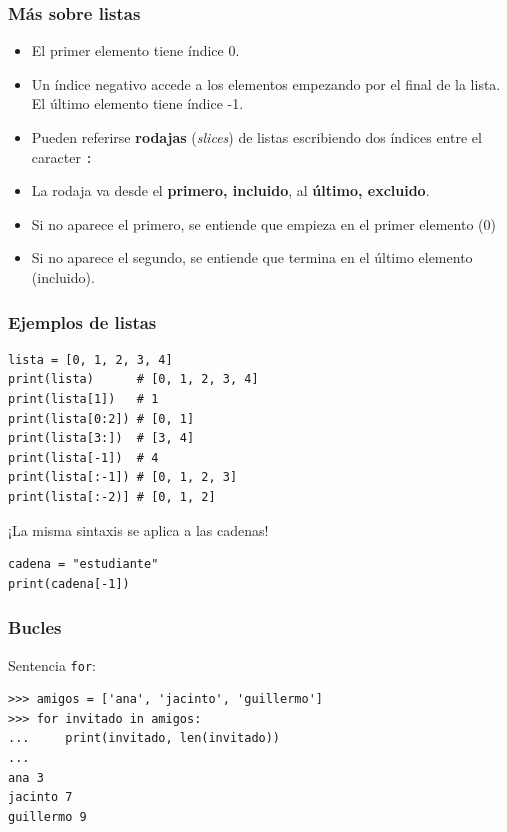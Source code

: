 \documentclass{beamer}
\begin{document}
\begin{frame}[fragile]
\frametitle{Más sobre listas}

\begin{itemize}
\item El primer elemento tiene índice 0.
\item Un índice negativo accede a los elementos empezando por el final
  de la lista. El último elemento tiene índice -1.
\item Pueden referirse {\bf rodajas} (\emph{slices}) de listas
  escribiendo dos índices entre el caracter \verb|:|
\item La rodaja va desde el {\bf primero, incluido}, al {\bf último,
    excluido}.
\item Si no aparece el primero, se entiende que empieza en el primer
  elemento (0)
\item Si no aparece el segundo, se entiende que termina en el último
  elemento (incluido). 
\end{itemize}
\end{frame}


\begin{frame}[fragile]
\frametitle{Ejemplos de listas}

  \begin{footnotesize}
\begin{verbatim}
lista = [0, 1, 2, 3, 4]
print(lista)      # [0, 1, 2, 3, 4]
print(lista[1])   # 1 
print(lista[0:2]) # [0, 1]
print(lista[3:])  # [3, 4]
print(lista[-1])  # 4
print(lista[:-1]) # [0, 1, 2, 3]
print(lista[:-2)] # [0, 1, 2]
\end{verbatim}
  \end{footnotesize}
  \begin{center}
¡La misma sintaxis se aplica a las cadenas!
  \end{center}

  \begin{footnotesize}
\begin{verbatim}
cadena = "estudiante"
print(cadena[-1])
\end{verbatim}
  \end{footnotesize}


\end{frame}


\begin{frame}[fragile]

\frametitle{ Bucles}
Sentencia \verb|for|:

\begin{footnotesize}
\begin{verbatim}
>>> amigos = ['ana', 'jacinto', 'guillermo']
>>> for invitado in amigos:
...     print(invitado, len(invitado))
... 
ana 3
jacinto 7
guillermo 9 
\end{verbatim}
\end{footnotesize}



\end{frame}
\end{document}
